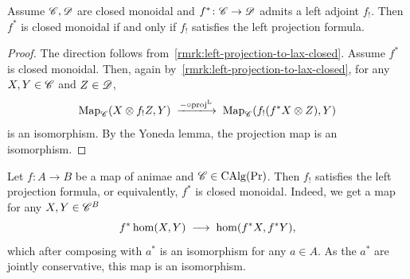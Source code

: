 \documentclass[english,svgnames,table]{article}
\begin{document}
    \begin{corollary}
    \label{lem:left-projection}
        Assume $\mathscr{C}, \mathscr{D}$ are closed monoidal and $f^* \colon \mathscr{C} \to \mathscr{D}$ admits a left adjoint $f_!$. Then $f^*$ is closed monoidal if and only if $f_!$ satisfies the left projection formula.
    \end{corollary}
    \begin{proof}
        The  direction follows from~\cref{rmrk:left-projection-to-lax-closed}.
        Assume $f^*$ is closed monoidal. Then, again by~\cref{rmrk:left-projection-to-lax-closed}, for any $X, Y\in \mathscr{C}$ and $Z \in \mathscr{D}$,
        \begin{equation*}
            \Map_{\cC}(X \otimes f_! Z, Y) \;\xtoo{- \circ \Lproj}\; \Map_{\cC}(f_!(f^* X \otimes Z), Y)
        \end{equation*}
        is an isomorphism. By the Yoneda lemma, the projection map is an isomorphism.
    \end{proof}

    \begin{example}
    \label{exm:f!-projection-formula}
        Let $f \colon A \to B$ be a map of animae and $\mathscr{C} \in \operatorname{CAlg}(\operatorname{Pr})$. Then $f_!$ satisfies the left projection formula, or equivalently, $f^*$ is closed monoidal. Indeed, we get a map for any $X, Y \in \mathscr{C}^B$
        \begin{equation*}
            f^* \hom(X, Y) \;\longrightarrow\; \hom(f^* X, f^* Y),
        \end{equation*}
        which after composing with $a^*$ is an isomorphism for any $a \in A$. As the $a^*$ are jointly conservative, this map is an isomorphism.
    \end{example}
\end{document}
